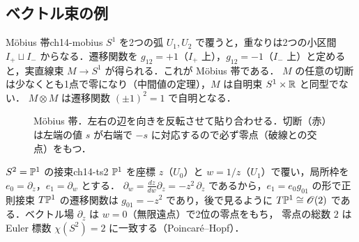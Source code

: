 \subsection{ベクトル束の例}

\begin{myex}{Möbius 帯}{ch14-mobius}
$S^1$ を2つの弧 $U_1,U_2$ で覆うと，重なりは2つの小区間 $I_+\sqcup I_-$ からなる．遷移関数を
$g_{12}=+1$（$I_+$ 上），$g_{12}=-1$（$I_-$ 上）と定めると，実直線束 $M\to S^1$ が得られる．これが Möbius 帯である．
$M$ の任意の切断は少なくとも1点で零になり（中間値の定理），$M$ は自明束 $S^1\times\mathbb{R}$ と同型でない．
$M\otimes M$ は遷移関数 $(\pm1)^2=1$ で自明となる．
\end{myex}

\begin{figure}[ht]
\centering
{}
\caption{Möbius 帯．左右の辺を向きを反転させて貼り合わせる．切断（赤）は左端の値 $s$ が右端で $-s$ に対応するので必ず零点（破線との交点）をもつ．}
\label{fig:ch14-mobius}
\end{figure}

\begin{myex}{$S^2=\mathbb{P}^1$ の接束}{ch14-ts2}
$\mathbb{P}^1$ を座標 $z$（$U_0$）と $w=1/z$（$U_1$）で覆い，局所枠を $e_0=\partial_z$，$e_1=\partial_w$ とする．
$\partial_w = \frac{dz}{dw}\partial_z = -z^2\,\partial_z$ であるから，$e_1=e_0g_{01}$ の形で正則接束 $T\mathbb{P}^1$ の遷移関数は
$g_{01}=-z^2$ であり，後で見るように $T\mathbb{P}^1\cong\mathscr{O}(2)$ である．ベクトル場 $\partial_z$ は $w=0$（無限遠点）で2位の零点をもち，
零点の総数 $2$ は Euler 標数 $\chi(S^2)=2$ に一致する（Poincaré--Hopf）．
\end{myex}

